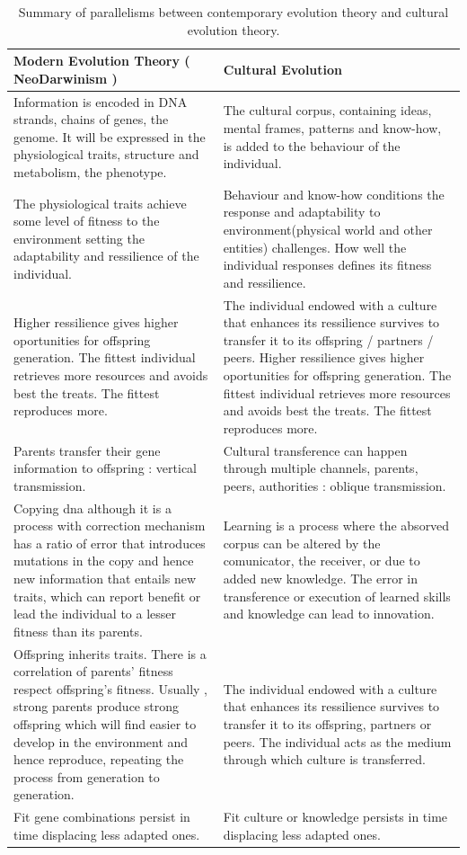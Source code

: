 \documentclass[11pt,oneside,a4paper,openright]{report}
\begin{document}
	\begin{table}[ht!]
	\centering
	\begin{tabular}{|p{7cm}|p{7cm}|}
		\hline
		\textbf{Modern Evolution Theory} ( NeoDarwinism )
		&
		\textbf{Cultural Evolution}\\
		\hline
		Information is encoded in DNA strands, chains of genes, the genome. It will be expressed in the physiological traits, structure and metabolism, the phenotype.
		&
		The cultural corpus, containing ideas, mental frames, patterns and know-how, is added to the behaviour of the individual.\\
		\hline
		The physiological traits achieve some level of fitness to the environment setting the adaptability and ressilience of the individual.
		&
		Behaviour and know-how conditions the response  and adaptability to environment(physical world and other entities) challenges. How well the individual responses defines its fitness and ressilience.\\
		\hline
		Higher ressilience gives higher oportunities for offspring generation. The fittest individual retrieves more resources and avoids best the treats. The fittest reproduces more.
		&
		The individual endowed with a culture that enhances its ressilience survives to transfer it to its offspring / partners / peers. Higher ressilience gives higher oportunities for offspring generation. The fittest individual retrieves more resources and avoids best the treats. The fittest reproduces more.\\
		\hline
		Parents transfer their gene information to offspring : vertical transmission.
		&
		Cultural transference can happen through multiple channels, parents, peers, authorities : oblique transmission.\\	
		\hline
		Copying dna although it is a process with correction mechanism has a ratio of error that introduces mutations in the copy and hence new information that entails new traits, which can report benefit or lead the individual to a lesser fitness than its parents.
		&
		Learning is a process where the absorved corpus can be altered by the comunicator, the receiver, or due to added new knowledge. The error in transference or execution of learned skills and knowledge can lead to innovation.\\
		\hline
		Offspring inherits traits. There is a correlation of parents' fitness respect offspring's fitness. Usually , strong parents produce strong offspring which will find easier to develop in the environment and hence reproduce, repeating the process from generation to generation.
		&
		The individual endowed with a culture that enhances its ressilience survives to transfer it to its offspring, partners or peers. The individual acts as the medium through which culture is transferred.\\ 
		\hline
		Fit gene combinations persist in time displacing less adapted ones.
		&
		Fit culture or knowledge persists in time displacing less adapted ones.\\		
		\hline
	\end{tabular}
	\caption{Summary of parallelisms between contemporary evolution theory and cultural evolution theory.}
	\label{tab:EvolThVSCultevol}
	\end{table}
\end{document}
